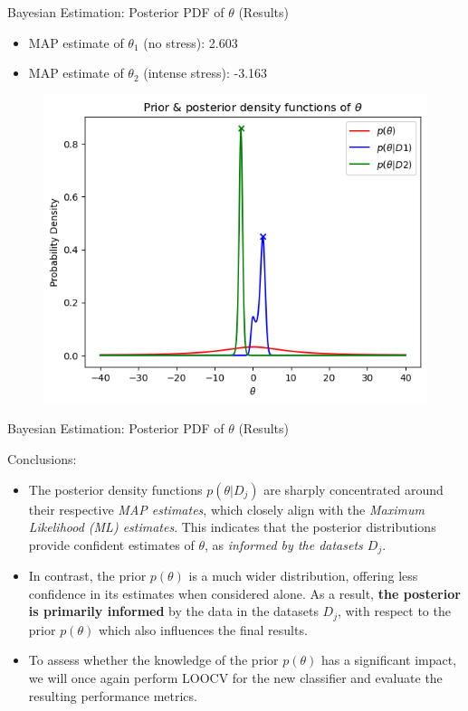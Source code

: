 \documentclass[aspectratio=169,xcolor=dvipsnames]{beamer}
\begin{document}
\begin{frame}{Bayesian Estimation: Posterior PDF of $\theta$ (Results)}

    \begin{itemize}
        \item MAP estimate of $\theta_1$ (no stress):       2.603
        \item MAP estimate of $\theta_2$ (intense stress): -3.163
    \end{itemize}

    \begin{figure}
        \centering
        \includegraphics[width=0.5\linewidth]{out/plot5_PriorAndPosteriorPDFofTheta.png}
        \label{fig:1}
    \end{figure}


\end{frame}


\begin{frame}{Bayesian Estimation: Posterior PDF of $\theta$ (Results)}

    Conclusions:
    \begin{itemize}
        \item The posterior density functions $p(\theta | D_j)$ are sharply concentrated around their respective \textit{MAP estimates}, which closely align with the \textit{Maximum Likelihood (ML) estimates}. This indicates that the posterior distributions provide confident estimates of $\theta$, as \textit{informed by the datasets $D_j$}.

        \item In contrast, the prior $p(\theta)$ is a much wider distribution, offering less confidence in its estimates when considered alone. As a result, \textbf{the posterior is primarily informed} by the data in the datasets $D_j$, with respect to the prior $p(\theta)$ which also influences the final results.

        \item To assess whether the knowledge of the prior $p(\theta)$ has a significant impact, we will once again perform LOOCV for the new classifier and evaluate the resulting performance metrics.
        
    \end{itemize}

\end{frame}
\end{document}
